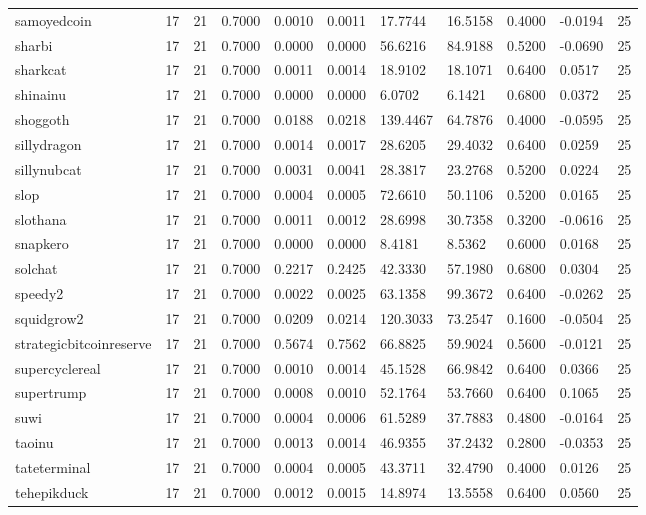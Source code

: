 \begin{table}[htbp]
\begin{tabular}{lllllllllll}
samoyedcoin & 17 & 21 & 0.7000 & 0.0010 & 0.0011 & 17.7744 & 16.5158 & 0.4000 & -0.0194 & 25 \\
sharbi & 17 & 21 & 0.7000 & 0.0000 & 0.0000 & 56.6216 & 84.9188 & 0.5200 & -0.0690 & 25 \\
sharkcat & 17 & 21 & 0.7000 & 0.0011 & 0.0014 & 18.9102 & 18.1071 & 0.6400 & 0.0517 & 25 \\
shinainu & 17 & 21 & 0.7000 & 0.0000 & 0.0000 & 6.0702 & 6.1421 & 0.6800 & 0.0372 & 25 \\
shoggoth & 17 & 21 & 0.7000 & 0.0188 & 0.0218 & 139.4467 & 64.7876 & 0.4000 & -0.0595 & 25 \\
sillydragon & 17 & 21 & 0.7000 & 0.0014 & 0.0017 & 28.6205 & 29.4032 & 0.6400 & 0.0259 & 25 \\
sillynubcat & 17 & 21 & 0.7000 & 0.0031 & 0.0041 & 28.3817 & 23.2768 & 0.5200 & 0.0224 & 25 \\
slop & 17 & 21 & 0.7000 & 0.0004 & 0.0005 & 72.6610 & 50.1106 & 0.5200 & 0.0165 & 25 \\
slothana & 17 & 21 & 0.7000 & 0.0011 & 0.0012 & 28.6998 & 30.7358 & 0.3200 & -0.0616 & 25 \\
snapkero & 17 & 21 & 0.7000 & 0.0000 & 0.0000 & 8.4181 & 8.5362 & 0.6000 & 0.0168 & 25 \\
solchat & 17 & 21 & 0.7000 & 0.2217 & 0.2425 & 42.3330 & 57.1980 & 0.6800 & 0.0304 & 25 \\
speedy2 & 17 & 21 & 0.7000 & 0.0022 & 0.0025 & 63.1358 & 99.3672 & 0.6400 & -0.0262 & 25 \\
squidgrow2 & 17 & 21 & 0.7000 & 0.0209 & 0.0214 & 120.3033 & 73.2547 & 0.1600 & -0.0504 & 25 \\
strategicbitcoinreserve & 17 & 21 & 0.7000 & 0.5674 & 0.7562 & 66.8825 & 59.9024 & 0.5600 & -0.0121 & 25 \\
supercyclereal & 17 & 21 & 0.7000 & 0.0010 & 0.0014 & 45.1528 & 66.9842 & 0.6400 & 0.0366 & 25 \\
supertrump & 17 & 21 & 0.7000 & 0.0008 & 0.0010 & 52.1764 & 53.7660 & 0.6400 & 0.1065 & 25 \\
suwi & 17 & 21 & 0.7000 & 0.0004 & 0.0006 & 61.5289 & 37.7883 & 0.4800 & -0.0164 & 25 \\
taoinu & 17 & 21 & 0.7000 & 0.0013 & 0.0014 & 46.9355 & 37.2432 & 0.2800 & -0.0353 & 25 \\
tateterminal & 17 & 21 & 0.7000 & 0.0004 & 0.0005 & 43.3711 & 32.4790 & 0.4000 & 0.0126 & 25 \\
tehepikduck & 17 & 21 & 0.7000 & 0.0012 & 0.0015 & 14.8974 & 13.5558 & 0.6400 & 0.0560 & 25 \\

\end{tabular}
\end{table}
